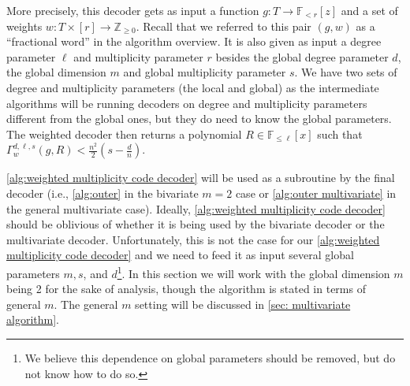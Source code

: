 \documentclass{theoretics}
\def\Integer{\mathbb{Z}}
\def\Field{\mathbb{F}}
\let\Z\Integer
\let\F\Field
\begin{document}
	More precisely, this decoder gets as input a function $g\colon T \to
	\F_{<r}[z]$ and a set of weights $w\colon T \times [r] \to \Z_{\geq
		0}$. Recall that we referred to this pair $(g,w)$ as a ``fractional word'' in
	the algorithm overview. It is also given as input a degree parameter
	$\ell$ and multiplicity parameter $r$ besides the global degree
	parameter $d$, the global dimension $m$ and global multiplicity parameter $s$. We have two
	sets of degree and multiplicity parameters (the local and global) as
	the intermediate algorithms will be running decoders on degree and
	multiplicity parameters different from the global ones, but they
	do need to know the global parameters. The weighted decoder
	then returns a polynomial $R \in \F_{\leq \ell}[x]$ such that
	$\Gamma_w^{d, \ell, s}(g, R) < \frac{n^2}{2}\left(s - \frac{d}{n}\right)$.
	
	\cref{alg:weighted multiplicity code decoder} will be used as a subroutine by the final decoder (i.e., \cref{alg:outer} in the bivariate $m=2$ case or \cref{alg:outer multivariate} in the general multivariate case). Ideally, \cref{alg:weighted multiplicity code decoder} should be oblivious of whether it is being used by the bivariate decoder or the multivariate decoder. Unfortunately, this is not the case for our \cref{alg:weighted multiplicity code decoder} and we need to feed it as input several global parameters $m, s$, and $d$\footnote{We believe this dependence on global parameters should be removed, but do not know how to do so.}. In this section we will work with the global dimension $m$ being 2 for the sake of analysis, though the algorithm is stated in terms of general $m$. The general $m$ setting will be discussed in \cref{sec: multivariate algorithm}.
	
	
\end{document}
